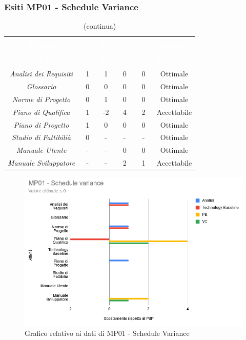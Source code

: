 \subsubsection{Esiti MP01 - Schedule Variance} 
\begin{longtable}{c c c c c c}
\rowcolor{white}\caption{Esiti MP01 - Schedule Variance} \\
		\rowcolor{redafk}
\textcolor{white}{\textbf{Attività}} &
\textcolor{white}{\textbf{An}} &
\textcolor{white}{\textbf{TB}} &
\textcolor{white}{\textbf{PB}} &
\textcolor{white}{\textbf{VC}} &
\textcolor{white}{\textbf{Riscontro}} \\
		\endfirsthead
		\rowcolor{white}\caption[]{(continua)} \\
		\rowcolor{redafk}
\textcolor{white}{\textbf{Attività}} &
\textcolor{white}{\textbf{An}} &
\textcolor{white}{\textbf{TB}} &
\textcolor{white}{\textbf{PB}} &
\textcolor{white}{\textbf{VC}} &
\textcolor{white}{\textbf{Riscontro}} \\
		\endhead
\textit{Analisi dei Requisiti} & 
1 &
1 &
0 &
0 &
Ottimale \\
\textit{Glossario} & 
0 &
0 &
0 &
0 &
Ottimale \\
\textit{Norme di Progetto} & 
0 &
1 &
0 &
0 &
Ottimale \\
\textit{Piano di Qualifica} & 
1 &
-2 &
4 &
2 &
Accettabile \\
\textit{Piano di Progetto} & 
1 &
0 &
0 &
0 &
Ottimale \\
\textit{Studio di Fattibilià} & 
0 &
- &
- &
- &
Ottimale \\
\textit{Manuale Utente} &
- &
- &
0 &
0 &
Ottimale \\
\textit{Manuale Sviluppatore} &
- &
- &
2 &
1 &
Accettabile \\
\end{longtable}

\begin{figure}[H]
\centering
\includegraphics[scale=0.7]{./img/MP01_schedule_variance.png}
\caption{Grafico relativo ai dati di MP01 - Schedule Variance}
\end{figure}
\pagebreak
